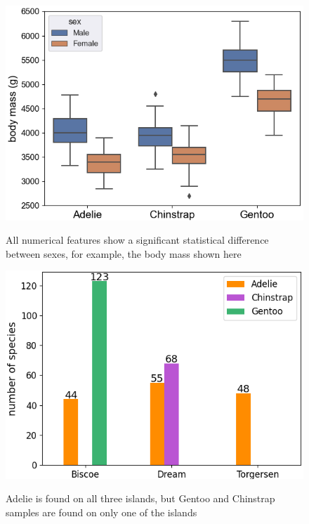 \documentclass[a4paper, 11pt]{article}
\begin{document}
\begin{figure}[!ht]
  \vspace{-0.5\baselineskip} %
  \begin{minipage}{0.5\textwidth}
    \vspace{0\baselineskip} %
    \centering
    \includegraphics[width=1\textwidth]{sex.png} %
    \vspace{-1.5\baselineskip} %
    \caption{All numerical features show a significant statistical difference between sexes, for example, the body mass shown here}
    \vspace{-1\baselineskip} %
    \label{fig:sex}
  \end{minipage}\hfill
  \begin{minipage}{0.5\textwidth}
    \vspace{0\baselineskip} %
    \centering
    \includegraphics[width=1\textwidth]{islands.png} %
    \vspace{-1.5\baselineskip} %
    \caption{Adelie is found on all three islands, but Gentoo and Chinstrap samples are found on only one of the islands}
    \vspace{-1\baselineskip} %
    \label{fig:islands}
  \end{minipage}
\end{figure}
\end{document}
